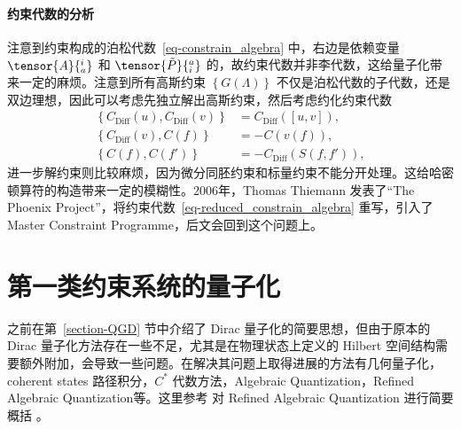 	\paragraph{约束代数的分析} 注意到约束构成的泊松代数~\eqref{eq-constrain_algebra} 中，右边是依赖变量 $\tensor{A}{^i_a}$ 和 $\tensor{\tilde{P}}{^a_i}$ 的，故约束代数并非李代数，这给量子化带来一定的麻烦。注意到所有高斯约束 $\left\{ G(\Lambda) \right\}$ 不仅是泊松代数的子代数，还是双边理想，因此可以考虑先独立解出高斯约束，然后考虑约化约束代数
	\begin{equation}
		\begin{split}
			\left\{ C_{\mathrm{Diff}}(u), C_{\text{Diff}}(v) \right\} &= C_{\text{Diff}}([u,v]),\\
			\left\{ C_{\text{Diff}}(v), C(f) \right\} &= - C(v(f)),\\
			\left\{ C(f), C(f') \right\} &= - C_{\text{Diff}}(S(f,f')),\label{eq-reduced_constrain_algebra}
		\end{split}
	\end{equation}
	进一步解约束则比较麻烦，因为微分同胚约束和标量约束不能分开处理。这给哈密顿算符的构造带来一定的模糊性\cite{Han2005,Thiemann1996aw}。2006年，Thomas Thiemann 发表了“The Phoenix Project”\cite{Thiemann2003zv}，将约束代数~\eqref{eq-reduced_constrain_algebra} 重写，引入了 Master Constraint Programme，后文会回到这个问题上。

	\section{第一类约束系统的量子化}

		之前在第~\ref{section-QGD} 节中介绍了 Dirac 量子化的简要思想，但由于原本的 Dirac 量子化方法存在一些不足，尤其是在物理状态上定义的 Hilbert 空间结构需要额外附加，会导致一些问题。在解决其问题上取得进展的方法有几何量子化，coherent states 路径积分，$C^*$ 代数方法，Algebraic Quantization，Refined Algebraic Quantization等。这里参考 \cite{Han2005,Thiemann0210094, Thiemann2007,arXiv9812024} 对 Refined Algebraic Quantization 进行简要概括
		。


